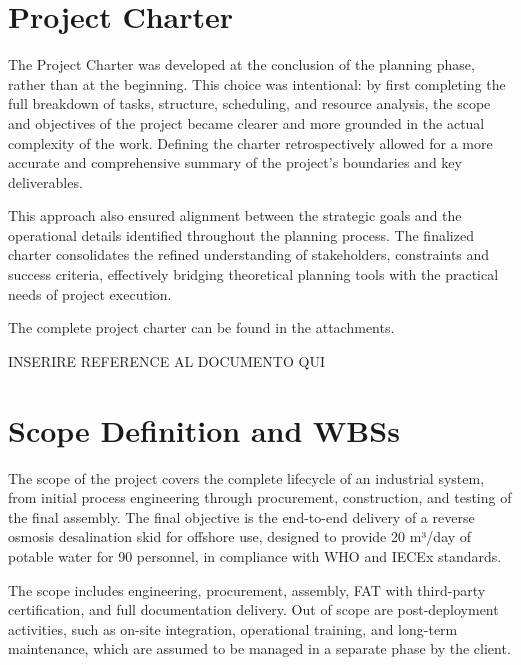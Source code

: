 \section{Project Charter}

The Project Charter was developed at the conclusion of the planning phase, rather than at the beginning. This choice was intentional: by first completing the full breakdown of tasks, structure, scheduling, and resource analysis, the scope and objectives of the project became clearer and more grounded in the actual complexity of the work. Defining the charter retrospectively allowed for a more accurate and comprehensive summary of the project’s boundaries and key deliverables.

This approach also ensured alignment between the strategic goals and the operational details identified throughout the planning process. The finalized charter consolidates the refined understanding of stakeholders, constraints and success criteria, effectively bridging theoretical planning tools with the practical needs of project execution.

The complete project charter can be found in the attachments.

INSERIRE REFERENCE AL DOCUMENTO QUI

\section{Scope Definition and WBSs}

The scope of the project covers the complete lifecycle of an industrial system, from initial process engineering through procurement, construction, and testing of the final assembly.
The final objective is the end-to-end delivery of a reverse osmosis desalination skid for offshore use, designed to provide 20 m³/day of potable water for 90 personnel, in compliance with WHO and IECEx standards.

The scope includes engineering, procurement, assembly, FAT with third-party certification, and full documentation delivery.
Out of scope are post-deployment activities, such as on-site integration, operational training, and long-term maintenance, which are assumed to be managed in a separate phase by the client.

